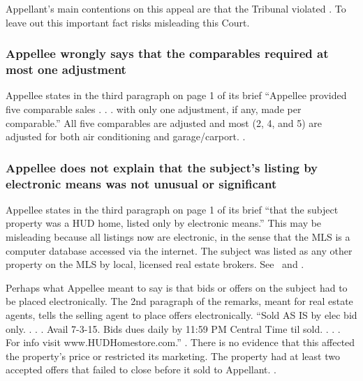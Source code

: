 \documentclass[12pt,\documentclassflag]{michiganCourtOfAppealsBrief}
\begin{document}
Appellant's main contentions on this appeal are that the Tribunal violated \mathieuGast. To leave out this important fact risks misleading this Court.

\subsubsection{Appellee wrongly says that the comparables required at most one adjustment}

Appellee states in the third paragraph on page 1 of its brief ``Appellee provided five comparable sales . . . with only one adjustment, if any, made per comparable.'' All five comparables are adjusted and most (2, 4, and 5) are adjusted for both air conditioning and garage/carport. \cityEvidence[2].

\subsubsection{Appellee does not explain that the subject's listing by electronic means was not unusual or significant}


Appellee states in the third paragraph on page 1 of its brief ``that the subject property was a HUD home, listed only by electronic means.'' This may be misleading because all listings now are electronic, in the sense that the MLS is a computer database accessed via the internet. The subject was listed as any other property on the MLS by local, licensed real estate brokers. See \mlsListing\ and \mlsHistory.

Perhaps what Appellee meant to say is that bids or offers on the subject had to be placed electronically. The 2nd paragraph of the remarks, meant for real estate agents, tells the selling agent to place offers electronically. ``Sold AS IS by elec bid only. . . . Avail 7-3-15. Bids dues daily by 11:59 PM Central Time til sold. . . . For info visit www.HUDHomestore.com.'' \mlsListing. There is no evidence that this affected the property's price or restricted its marketing. The property had at least two accepted offers that failed to close before it sold to Appellant. \mlsHistory.

\end{document}
